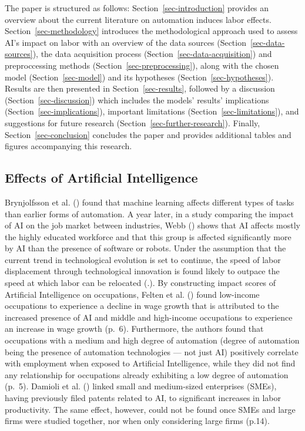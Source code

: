 \documentclass[
  12pt,
  a4paperpaper,
]{article}
\begin{document}
The paper is structured as follows: Section~\ref{sec-introduction}
provides an overview about the current literature on automation induces
labor effects. Section~\ref{sec-methodology} introduces the
methodological approach used to assess AI's impact on labor with an
overview of the data sources (Section~\ref{sec-data-sources}), the data
acquisition process (Section~\ref{sec-data-acquisition}) and
preproccessing methods (Section~\ref{sec-preprocessing}), along with the
chosen model (Section~\ref{sec-model}) and its hypotheses
(Section~\ref{sec-hypotheses}). Results are then presented in
Section~\ref{sec-results}, followed by a discussion
(Section~\ref{sec-discussion}) which includes the models' results'
implications (Section~\ref{sec-implications}), important limitations
(Section~\ref{sec-limitations}), and suggestions for future research
(Section~\ref{sec-further-research}). Finally,
Section~\ref{sec-conclusion} concludes the paper and
 provides additional tables and figures
accompanying this research.

\subsection{Effects of Artificial Intelligence}\label{sec-effects-of-ai}

Brynjolfsson et al. () found that machine learning affects different types of tasks than
earlier forms of automation. A year later, in a study comparing the
impact of AI on the job market between industries, Webb
() shows that AI affects
mostly the highly educated workforce and that this group is affected
significantly more by AI than the presence of software or robots. Under
the assumption that the current trend in technological evolution is set
to continue, the speed of labor displacement through technological
innovation is found likely to outpace the speed at which labor can be
relocated (.). By constructing impact scores of Artificial Intelligence on
occupations, Felten et al. ()
found low-income occupations to experience a decline in wage growth that
is attributed to the increased presence of AI and middle and high-income
occupations to experience an increase in wage growth (p.~6).
Furthermore, the authors found that occupations with a medium and high
degree of automation (degree of automation being the presence of
automation technologies --- not just AI) positively correlate with
employment when exposed to Artificial Intelligence, while they did not
find any relationship for occupations already exhibiting a low degree of
automation (p.~5). Damioli et al.
() linked small and
medium-sized enterprises (SMEs), having previously filed patents related
to AI, to significant increases in labor productivity. The same effect,
however, could not be found once SMEs and large firms were studied
together, nor when only considering large firms (p.14).
\end{document}
